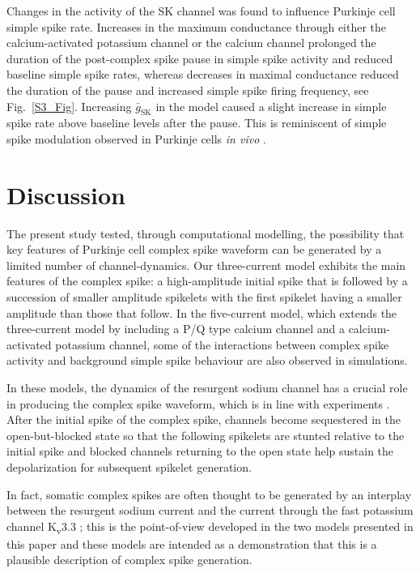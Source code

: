 \documentclass[twocolumn]{svjour3}          %
\newcommand{\sk}{\mathrm{SK}}
\begin{document}
Changes in the activity of the SK channel was found to influence
Purkinje cell simple spike rate. Increases in the maximum conductance
through either the calcium-activated potassium channel or the calcium
channel prolonged the duration of the post-complex spike pause in
simple spike activity and reduced baseline simple spike rates, whereas
decreases in maximal conductance reduced the duration of the pause and
increased simple spike firing frequency, see
Fig.~\ref{S3_Fig}. Increasing $\bar{g}_\sk$ in the model caused a
slight increase in simple spike rate above baseline levels after the
pause. This is reminiscent of simple spike modulation observed in
Purkinje cells \textsl{in vivo} \citep{BurroughsEtAl2016}.


\section{Discussion}


The present study tested, through computational modelling, the
possibility that key features of Purkinje cell complex spike waveform
can be generated by a limited number of channel-dynamics. Our
three-current model exhibits the main features of the complex spike: a
high-amplitude initial spike that is followed by a succession of
smaller amplitude spikelets with the first spikelet having a smaller
amplitude than those that follow. In the five-current model, which
extends the three-current model by including a P/Q type calcium
channel and a calcium-activated potassium channel, some of the
interactions between complex spike activity and background simple
spike behaviour are also observed in simulations.

In these models, the dynamics of the resurgent sodium channel has a
crucial role in producing the complex spike waveform, which is in line
with experiments
\citep{RamanBean1997,NolanEtAl2003,KhaliqRaman2006}. After the initial
spike of the complex spike, channels become sequestered in the
open-but-blocked state so that the following spikelets are stunted
relative to the initial spike and blocked channels returning to the
open state help sustain the depolarization for subsequent spikelet
generation.

In fact, somatic complex spikes are often thought to be generated by
an interplay between the resurgent sodium current
\citep{RamanBean1997,RamanBean2001,KhaliqEtAl2003,KhaliqRaman2006} and
the current through the fast potassium channel K\textsubscript{v}3.3
\citep{ZaghaEtAl2008,HurlockEtAl2008,VeysEtAl2013}; this is the
point-of-view developed in the two models presented in this paper and
these models are intended as a demonstration that this is a plausible
description of complex spike generation.
\end{document}
